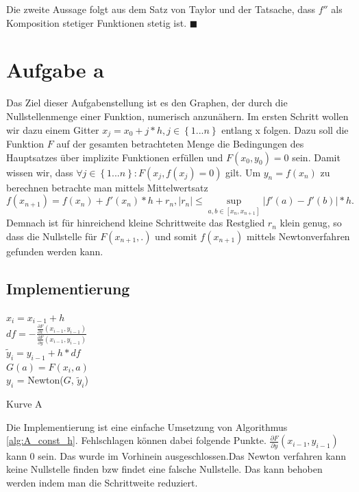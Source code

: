 \documentclass[a4paper,11pt,bibliography=totoc,listof=totoc,headinclude=true,cleardoublepage=empty,oneside]{scrartcl}
\newcommand{\diff}[2]{\frac{\partial #1}{\partial #2}}
\newcounter{satz}
\begin{document}
Die zweite Aussage folgt aus dem Satz von Taylor und der Tatsache, dass $f''$ als Komposition stetiger Funktionen stetig ist. \hfill $\blacksquare$

\section{Aufgabe a}
Das Ziel dieser Aufgabenstellung ist es den Graphen, der durch die Nullstellenmenge einer Funktion, numerisch anzunähern. Im ersten Schritt wollen wir dazu einem Gitter $x_j = x_0 + j*h, j \in \left\lbrace1...n\right\rbrace $ entlang x folgen. 
Dazu soll die Funktion $F$ auf der gesamten betrachteten Menge die Bedingungen des Hauptsatzes über implizite Funktionen erfüllen und $F(x_0,y_0)=0$ sein. Damit wissen wir, dass $\forall j \in \left\lbrace1...n\right\rbrace: F(x_j,f(x_j)=0)$ gilt. Um $y_n = f(x_n)$ zu berechnen betrachte man mittels Mittelwertsatz
\[
f(x_{n+1})=f(x_n)+f'(x_n)*h+r_n, \left|r_n\right|\leq \sup\limits_{a,b \in \left[x_n,x_{n+1}\right]}\left|{f'(a)-f'(b)}\right|*h.
\]
Demnach ist für hinreichend kleine Schrittweite das Restglied $r_n$ klein genug, so dass die Nullstelle für $F(x_{n+1},.)$ und somit $f(x_{n+1})$ mittels Newtonverfahren gefunden werden kann.
\subsection{Implementierung}
\begin{algorithm}
	\label{alg:A_const_h}
	{
		$x_i = x_{i-1}+h$\\
		$df = -\frac{\diff{F}{x}(x_{i-1},y_{i-1})}{\diff{F}{y}(x_{i-1},y_{i-1})}$\\
		$\tilde y_i = y_{i-1}+h*df$\\
		$G(a) = F(x_i,a)$\\
		$y_i$ = Newton($G$, $\tilde y_i$)
	}
	\caption{Kurve A}
\end{algorithm}
Die Implementierung ist eine einfache Umsetzung von Algorithmus \ref{alg:A_const_h}.
Fehlschlagen können dabei folgende Punkte. $\diff{F}{y}(x_{i-1},y_{i-1})$ kann 0 sein. Das wurde im Vorhinein ausgeschlossen.Das Newton verfahren kann keine Nullstelle finden bzw findet eine falsche Nullstelle. Das kann behoben werden indem man die Schrittweite reduziert.
\end{document}
